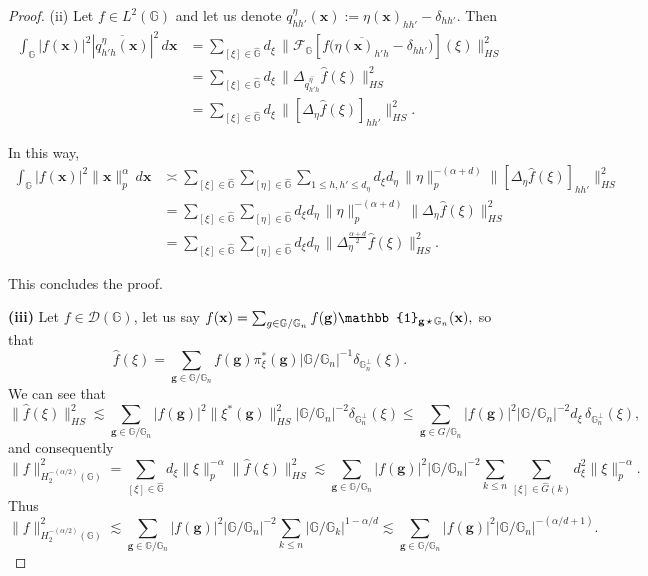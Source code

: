 \documentclass[10pt,a4paper]{amsart}
\newcommand{\G}{\mathbb{G}}
\newcommand{\smallstar}{\scalebox{0.8}{$\, \star \, $}}
\begin{document}
\begin{proof}
\noindent (ii) Let $f \in L^2(\mathbb{G})$ and let us denote $q^\eta_{hh'}(\mathbf{x}) := \eta (\mathbf{x})_{hh'} - \delta_{hh'} .$ Then
\begin{align*}
\int_{\mathbb{G}} |f(\mathbf{x})|^2 |\overline{q^\eta_{h'h}(\mathbf{x})}|^2 \, d\mathbf{x}
&= \sum_{[\xi] \in \widehat{\mathbb{G}}} 
d_\xi  \, \| \mathcal{F}_{\G} [ f\big( \overline{\eta(\mathbf{x})_{h'h}} - \delta_{hh'} \big)](\xi)\|_{HS}^2 \\
&= \sum_{[\xi] \in \widehat{\mathbb{G}}} 
d_\xi  \, \|\Delta_{\overline{q^\eta_{h'h}}} \hat{f}(\xi)\|_{HS}^2 \\
&= \sum_{[\xi] \in \widehat{\mathbb{G}}} 
d_\xi \, \| [\Delta_\eta \hat{f}(\xi)]_{hh'}\|_{HS}^2 .
\end{align*}

In this way,
\begin{align*}
\int_{\mathbb{G}} |f(\mathbf{x})|^2 \|\mathbf{x}\|_p^{\alpha} \, d\mathbf{x}
&\asymp \sum_{[\xi] \in \widehat{\mathbb{G}}} \sum_{[\eta] \in \widehat{\mathbb{G}}}
\sum_{1 \leq  h,h' \leq d_\eta}
d_\xi  d_\eta \, \|\eta\|_p^{-(\alpha+d)} 
\| [\Delta_\eta \hat{f}(\xi)]_{hh'} \|_{HS}^2 \\
&= \sum_{[\xi] \in \widehat{\mathbb{G}}} \sum_{[\eta] \in \widehat{\mathbb{G}}}
d_\xi d_\eta  \, \|\eta\|_p^{-(\alpha+d)} 
\|\Delta_\eta \hat{f}(\xi)\|_{HS}^2 \\
&= \sum_{[\xi] \in \widehat{\mathbb{G}}} \sum_{[\eta] \in \widehat{\mathbb{G}}}
d_\xi d_\eta\, 
\|\Delta^{\frac{\alpha+d}{2}}_\eta \hat{f}(\xi)\|_{HS}^2 .
\end{align*}

This concludes the proof.

\textbf{(iii)} Let $f \in \mathcal{D}(\mathbb{G})$, let us say $f(\mathbf{x}) = \sum_{g \in \mathbb{G} / \mathbb{G}_n} f(\mathbf{g}) \mathbb{1}_{\mathbf{g} \smallstar \mathbb{G}_n}(\mathbf{x}),$ so that
\[
\widehat{f}(\xi) = \sum_{\mathbf{g} \in \mathbb{G} / \mathbb{G}_n} f(\mathbf{g}) \pi^*_\xi(\mathbf{g}) |\mathbb{G} / \mathbb{G}_n|^{-1} \delta_{\mathbb{G}_n^\perp}(\xi).
\]
We can see that
\[
\|\widehat{f}(\xi)\|^2_{HS} \lesssim \sum_{\mathbf{g} \in \mathbb{G} / \mathbb{G}_n} |f(\mathbf{g})|^2 \|\xi^*(\mathbf{g})\|^2_{HS} |\mathbb{G} / \mathbb{G}_n|^{-2} \delta_{\mathbb{G}_n^\perp}(\xi)
\leq \sum_{\mathbf{g} \in G / \mathbb{G}_n} |f(\mathbf{g})|^2 |\mathbb{G} / \mathbb{G}_n|^{-2} d_\xi \, \delta_{\mathbb{G}_n^\perp}(\xi),
\]
and consequently
\[
\|f\|^2_{H^{-(\alpha/2)}_2(\mathbb{G})} 
= \sum_{[\xi] \in \widehat{\mathbb{G}}} d_\xi \|\xi\|^{-\alpha}_p \|\widehat{f}(\xi)\|^2_{HS}
\lesssim \sum_{\mathbf{g} \in \mathbb{G} / \mathbb{G}_n} |f(\mathbf{g})|^2 |\mathbb{G} / \mathbb{G}_n|^{-2}
\sum_{k \leq n} \sum_{[\xi] \in \widehat{G}(k)} d_\xi^2 \|\xi\|^{-\alpha}_p.
\]
Thus
\[
\|f\|^2_{H^{-(\alpha/2)}_2(\mathbb{G})} \lesssim 
\sum_{\mathbf{g} \in \mathbb{G} / \mathbb{G}_n} |f(\mathbf{g})|^2 |\mathbb{G} / \mathbb{G}_n|^{-2} 
\sum_{k \leq n} |\mathbb{G} / \G_k|^{1-\alpha/d}
\lesssim \sum_{\mathbf{g} \in \mathbb{G} / \mathbb{G}_n} |f(\mathbf{g})|^2 |\mathbb{G} / \mathbb{G}_n|^{-(\alpha/d+1)}.
\]


\end{proof}
\end{document}
